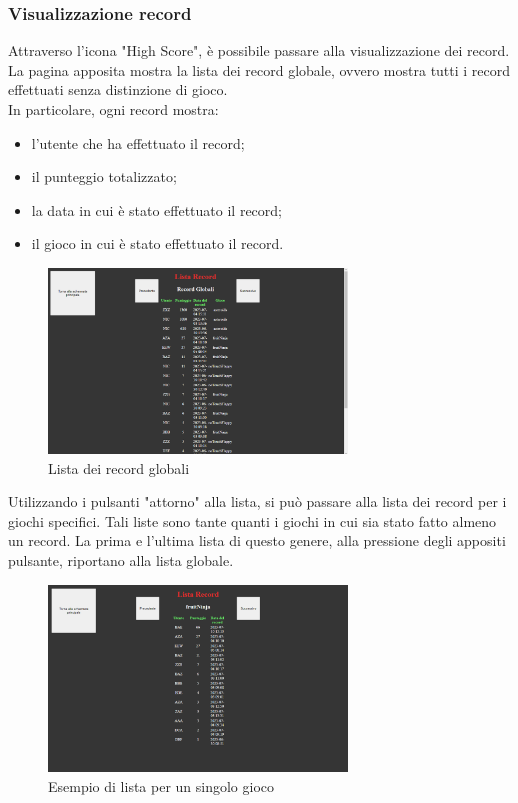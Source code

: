 \subsubsection{Visualizzazione record}
Attraverso l'icona "High Score", è possibile passare alla visualizzazione dei record.
La pagina apposita mostra la lista dei record globale, ovvero mostra tutti i record effettuati senza distinzione di gioco.\\
In particolare, ogni record mostra:
\begin{itemize}
    \item l'utente che ha effettuato il record;
    \item il punteggio totalizzato;
    \item la data in cui è stato effettuato il record;
    \item il gioco in cui è stato effettuato il record.
\end{itemize}
\begin{figure}[h]
    \centering
    \includegraphics[width=225pt]{images/product/schermataRecord.png}
    \caption{Lista dei record globali}
    \label{fig:schermataRecord}
\end{figure}
Utilizzando i pulsanti "attorno" alla lista, si può passare alla lista dei record per i giochi specifici.
Tali liste sono tante quanti i giochi in cui sia stato fatto almeno un record.
La prima e l'ultima lista di questo genere, alla pressione degli appositi pulsante, riportano alla lista globale.
\begin{figure}[h]
    \centering
    \includegraphics[width=225pt]{images/product/schermataRecordSingoloGioco.png}
    \caption{Esempio di lista per un singolo gioco}
    \label{fig:schermataRecordSingoloGioco}
\end{figure}
\newpage
